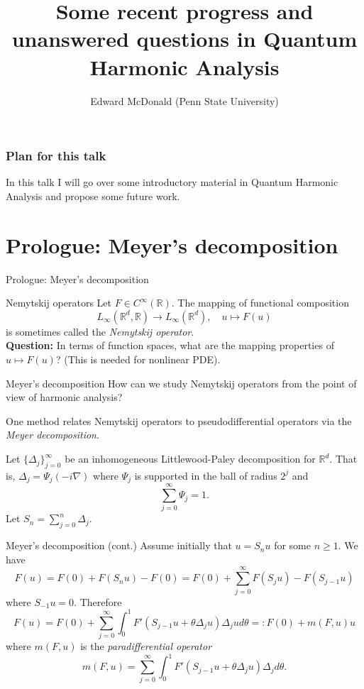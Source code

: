 \documentclass{beamer}
\newcommand\makebeamertitle{\frame{\maketitle}}%
\numberwithin{equation}{section}
\theoremstyle{plain}
\theoremstyle{plain}
\theoremstyle{definition}
\theoremstyle{plain}
\theoremstyle{plain}
\theoremstyle{definition}
\newcommand{\Rl}{\mathbb{R}}
\begin{document}
\title[Progress and Questions in QHA]{Some recent progress and unanswered questions in Quantum Harmonic Analysis}

\author[E. McDonald]{Edward McDonald (Penn State University)}



\makebeamertitle

\begin{frame}\frametitle{Plan for this talk}
    In this talk I will go over some introductory material in Quantum Harmonic Analysis and propose some future work.
\end{frame}

\section{Prologue: Meyer's decomposition}\label{meyer_section}

\begin{frame}
    \Huge{Prologue: Meyer's decomposition}
\end{frame}


\begin{frame}{Nemytskij operators}
    Let $F\in C^\infty(\Rl).$ The mapping of functional composition
    \[
        L_{\infty}(\Rl^d,\Rl)\to L_{\infty}(\Rl^d),\quad u\mapsto F(u)
    \]
    is sometimes called the \emph{Nemytskij operator}.\\
\pause
    \textbf{Question:} In terms of function spaces, what are the mapping properties of $u\mapsto F(u)$? (This is needed for nonlinear PDE).
\end{frame}

\begin{frame}{Meyer's decomposition}
    How can we study Nemytskij operators from the point of view of harmonic analysis?\pause

    One method relates Nemytskij operators to pseudodifferential operators via the \emph{Meyer decomposition}.\pause

    Let $\{\Delta_j\}_{j=0}^\infty$ be an inhomogeneous Littlewood-Paley decomposition for $\Rl^d.$ That is, $\Delta_j = \Psi_j(-i\nabla)$ where $\Psi_j$
    is supported in the ball of radius $2^j$ and
    \[
        \sum_{j=0}^\infty \Psi_j = 1.
    \]
    Let $S_n = \sum_{j=0}^n\Delta_j.$
\end{frame}

\begin{frame}{Meyer's decomposition (cont.)}
    Assume initially that $u=S_nu$ for some $n\geq 1.$ We have
    \[
        F(u) = F(0)+F(S_nu)-F(0) = F(0)+\sum_{j=0}^\infty F(S_ju)-F(S_{j-1}u)
    \]
    where $S_{-1}u=0.$ Therefore
    \[
        F(u) = F(0)+\sum_{j=0}^\infty \int_0^1 F'(S_{j-1}u+\theta \Delta_j u)\Delta_j u d\theta =: F(0)+m(F,u)u
    \]
    where $m(F,u)$ is the \emph{paradifferential operator}
    \[
        m(F,u) = \sum_{j=0}^\infty \int_0^1 F'(S_{j-1}u+\theta \Delta_ju)\Delta_j d\theta.
    \]
\end{frame}
\end{document}
